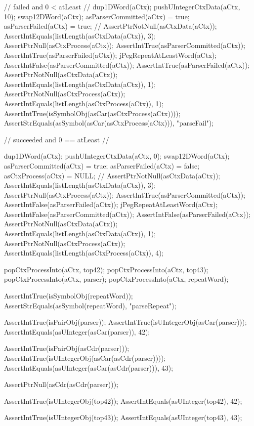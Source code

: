   // failed and 0 < atLeast
  //
  dup1DWord(aCtx);
  pushUIntegerCtxData(aCtx, 10);
  swap12DWord(aCtx);
  asParserCommitted(aCtx) = true;
  asParserFailed(aCtx) = true;
  //
  AssertPtrNotNull(asCtxData(aCtx));
  AssertIntEquals(listLength(asCtxData(aCtx)), 3);
  AssertPtrNull(asCtxProcess(aCtx));
  AssertIntTrue(asParserCommitted(aCtx));
  AssertIntTrue(asParserFailed(aCtx));
  jPegRepeatAtLeastWord(aCtx);
  AssertIntFalse(asParserCommitted(aCtx));
  AssertIntTrue(asParserFailed(aCtx));
  AssertPtrNotNull(asCtxData(aCtx));
  AssertIntEquals(listLength(asCtxData(aCtx)), 1);
  AssertPtrNotNull(asCtxProcess(aCtx));
  AssertIntEquals(listLength(asCtxProcess(aCtx)), 1);
  AssertIntTrue(isSymbolObj(asCar(asCtxProcess(aCtx))));
  AssertStrEquals(asSymbol(asCar(asCtxProcess(aCtx))), "parseFail");

  // succeeded and 0 == atLeast
  //
  {
  dup1DWord(aCtx);
  pushUIntegerCtxData(aCtx, 0);
  swap12DWord(aCtx);
  asParserCommitted(aCtx) = true;
  asParserFailed(aCtx) = false;
  asCtxProcess(aCtx) = NULL;
  //
  AssertPtrNotNull(asCtxData(aCtx));
  AssertIntEquals(listLength(asCtxData(aCtx)), 3);
  AssertPtrNull(asCtxProcess(aCtx));
  AssertIntTrue(asParserCommitted(aCtx));
  AssertIntFalse(asParserFailed(aCtx));
  jPegRepeatAtLeastWord(aCtx);
  AssertIntFalse(asParserCommitted(aCtx));
  AssertIntFalse(asParserFailed(aCtx));
  AssertPtrNotNull(asCtxData(aCtx));
  AssertIntEquals(listLength(asCtxData(aCtx)), 1);
  AssertPtrNotNull(asCtxProcess(aCtx));
  AssertIntEquals(listLength(asCtxProcess(aCtx)), 4);
    
  popCtxProcessInto(aCtx, top42);
  popCtxProcessInto(aCtx, top43);
  popCtxProcessInto(aCtx, parser);
  popCtxProcessInto(aCtx, repeatWord);
  
  AssertIntTrue(isSymbolObj(repeatWord));
  AssertStrEquals(asSymbol(repeatWord), "parseRepeat");
  
  AssertIntTrue(isPairObj(parser));
  AssertIntTrue(isUIntegerObj(asCar(parser)));
  AssertIntEquals(asUInteger(asCar(parser)), 42);
  
  AssertIntTrue(isPairObj(asCdr(parser)));
  AssertIntTrue(isUIntegerObj(asCar(asCdr(parser))));
  AssertIntEquals(asUInteger(asCar(asCdr(parser))), 43);
  
  AssertPtrNull(asCdr(asCdr(parser)));
  
  AssertIntTrue(isUIntegerObj(top42));
  AssertIntEquals(asUInteger(top42), 42);  

  AssertIntTrue(isUIntegerObj(top43));
  AssertIntEquals(asUInteger(top43), 43);  
  }
  
